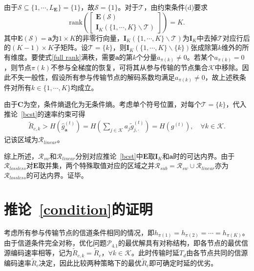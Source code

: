 由于$\mathcal{S}\subseteq\{1,\cdots,L_{\mathbf{E}}\}=\{1\}$，故$\mathcal{S}=\{1\}$。对于$\mathcal{T}$，由约束条件(d)要求
\begin{equation}
	\mathrm{rank}\left(\begin{bmatrix}
		\mathbf{E}(\mathcal{S})\\
		\mathbf{I}_K(\{1,\cdots,K\}\backslash\mathcal{T})
	\end{bmatrix}\right)=K.\label{full rank}
\end{equation}
其中$\mathbf{E}(\mathcal{S})=\mathbf{a}$为$1\times K$的非零行向量，$\mathbf{I}_K(\{1,\cdots,K\}\backslash\mathcal{T})$为$\mathbf{I}_K$中去掉$\mathcal{T}$对应行后的$(K-1)\times K$子矩阵。设$\mathcal{T}=\{k\}$，则$\mathbf{I}_K(\{1,\cdots,K\}\backslash\{k\})$张成除第$k$维外的所有维度。要使式\eqref{full rank}满秩，需要$\mathbf{a}$的第$k$个分量$a_{\pi(k)}\neq 0$。若某个$a_{\pi(k)}=0$，则节点$\pi(k)$不参与全梯度的恢复，可将其从参与传输的节点集合$\mathcal{K}$中移除。因此不失一般性，假设所有参与传输节点的解码系数均满足$a_{\pi(k)}\neq 0$，故上述秩条件对所有$k\in\{1,\cdots,K\}$均成立。

由于$\mathbf{C}$为空，条件熵退化为无条件熵。考虑单个符号位置，对每个$\mathcal{T}=\{k\}$，代入推论~\ref{bcst}的速率约束可得
\begin{align}
	\tilde{R}_{c,k}>H(\hat{g}_{\mathbf{a}}^{(t)})=H\left(\sum_{j\in\mathcal{K}}a_j\tilde{g}_{j,\cdot}^{(t)}\right)=H(g^{(t)}),\quad\forall k\in \mathcal{K}.
\end{align}
记该区域为$\mathcal{R}_{linear}$。

综上所述，$\mathcal{R}_{sw}$和$\mathcal{R}_{linear}$分别对应推论~\ref{bcst}中$\mathbf{E}$取$\mathbf{I}_K$和$\mathbf{a}$时的可达内界。由于$\mathcal{R}_{lossless}$对$\mathbf{E}$取并集，两个特殊取值对应的区域之并$\mathcal{R}_{sub}=\mathcal{R}_{sw}\cup\mathcal{R}_{linear}$亦为$\mathcal{R}_{lossless}$的可达内界。证毕。

\section{推论~\ref{condition}的证明}\label{<condition>}
考虑所有参与传输节点的信道条件相同的情况，即$h_{\pi(1)}=h_{\pi(2)}=\cdots=h_{\pi(K)}$。由于信道条件完全对称，优化问题$\mathcal{P}_{4.1}$的最优解具有对称结构，即各节点的最优信源编码速率相等，记为$\tilde{R}_{c,k}=\tilde{R}_c$，$\forall k\in\mathcal{K}$。此时传输时延$T_d$由各节点共同的信源编码速率$\tilde{R}_c$决定，因此比较两种策略下的最优$\tilde{R}_c$即可确定时延的优劣。

